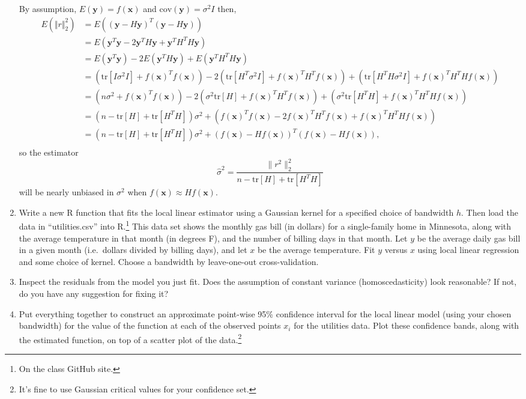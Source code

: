 \documentclass{homework}
\newcommand{\tr}{\text{tr}}
\newcommand{\1}{\mathbf{1}}
\newcommand{\x}{\mathbf{x}}
\newcommand{\y}{\mathbf{y}}
\begin{document}
\begin{enumerate}[label=(\Alph*)]
\par By assumption, $E(\mathbf{y}) = f(\mathbf{x})$ and $\text{cov}(\mathbf{y}) = \sigma^2 I$ then, 	
\begin{equation} \begin{split}
	E \left( \Vert r \Vert_2^2 \right) &= E \left( (\y - H\y)^T(\y-H\y) \right) \\
	&= E \left( \y^T \y - 2\y^T H \y + \y^T H^T H \y \right) \\
	&= E\left(\y^T \y  \right) - 2 E \left( \y^T H \y \right) + E \left( \y^T H^T H \y \right) \\
	&= \left( \tr\left[ I\sigma^2 I \right] + f(\x)^T f(\x) \right) - 2 \left( \tr\left[ H^T\sigma^2 I \right] + f(\x)^T H^T f(\x) \right) + \left( \tr \left[ H^T H \sigma^2 I \right] + f(\x)^T H^T H f(\x)\right) \\
	&= \left( n\sigma^2 + f(\x)^T f(\x) \right) - 2 \left( \sigma^2 \tr[H] + f(\x)^T H^T f(\x) \right) + \left( \sigma^2 \tr[H^TH] + f(\x)^T H^T H f(\x)\right) \\
	&= \left(n - \tr[H] + \tr [H^T H] \right) \sigma^2 + \left( f(\x)^T f(\x) - 2 f(\x)^T H^T f(\x) + f(\x)^T H^T H f(\x) \right) \\
	&= \left(n - \tr[H] + \tr [H^T H] \right) \sigma^2 + \left( f(\x) - Hf(\x) \right)^T \left( f(\x) - Hf(\x) \right),\\
\end{split} \end{equation}
	so the estimator $$\hat{\sigma}^2 = \frac{\| r^2 \|_2^2}{n - \tr[H] + \tr [H^T H]}$$ will be nearly unbiased in $\sigma^2$ when $f(\x) \approx H f(\x)$.


\item Write a new R function that fits the local linear estimator using a Gaussian kernel for a specified choice of bandwidth $h$. Then load the data in ``utilities.csv'' into R.\footnote{On the class GitHub site.}  This data set shows the monthly gas bill (in dollars) for a single-family home in Minnesota, along with the average temperature in that month (in degrees F), and the number of billing days in that month.  Let $y$ be the average daily gas bill in a given month (i.e.~dollars divided by billing days), and let $x$ be the average temperature.  Fit $y$ versus $x$ using local linear regression and some choice of kernel.  Choose a bandwidth by leave-one-out cross-validation.

\item Inspect the residuals from the model you just fit.  Does the assumption of constant variance (homoscedasticity) look reasonable?  If not, do you have any suggestion for fixing it?

\item Put everything together to construct an approximate point-wise 95\% confidence interval for the local linear model (using your chosen bandwidth) for the value of the function at each of the observed points $x_i$ for the utilities data.  Plot these confidence bands, along with the estimated function, on top of a scatter plot of the data.\footnote{It's fine to use Gaussian critical values for your confidence set.}

\end{enumerate}
\end{document}
